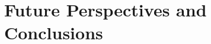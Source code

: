 \documentclass{article}
\newcommand{\beginsupplement}{%
        \setcounter{table}{0}
        \renewcommand{\thetable}{S\arabic{table}}%
        \setcounter{figure}{0}
        \renewcommand{\thefigure}{S\arabic{figure}}%
     }
\begin{document}
\section*{Future Perspectives and Conclusions}






% 
% 




\end{document}
